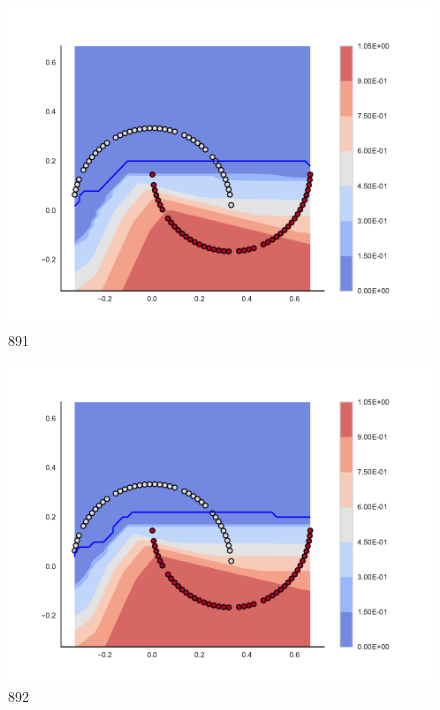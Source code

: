\begin{subfigure}[b]{0.09\textwidth}
    \includegraphics[clip, trim=2.35cm 1.75cm 4.5cm 0cm,width=\textwidth]{img/convergence/891.pdf}
    \caption{891}
    \label{fig:convergence_891}
\end{subfigure}
%
\begin{subfigure}[b]{0.09\textwidth}
    \includegraphics[clip, trim=2.35cm 1.75cm 4.5cm 0cm,width=\textwidth]{img/convergence/892.pdf}
    \caption{892}
    \label{fig:convergence_892}
\end{subfigure}
%
